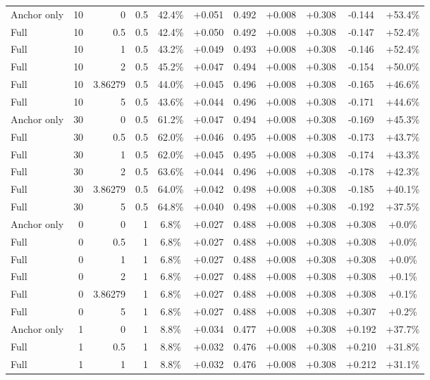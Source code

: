\begin{table}[htbp]
\begin{tabular}{lrrrccccccc}
Anchor only & 10 & 0 & 0.5 & 42.4\% & +0.051 & 0.492 & +0.008 & +0.308 & -0.144 & +53.4\% \\
Full & 10 & 0.5 & 0.5 & 42.4\% & +0.050 & 0.492 & +0.008 & +0.308 & -0.147 & +52.4\% \\
Full & 10 & 1 & 0.5 & 43.2\% & +0.049 & 0.493 & +0.008 & +0.308 & -0.146 & +52.4\% \\
Full & 10 & 2 & 0.5 & 45.2\% & +0.047 & 0.494 & +0.008 & +0.308 & -0.154 & +50.0\% \\
Full & 10 & 3.86279 & 0.5 & 44.0\% & +0.045 & 0.496 & +0.008 & +0.308 & -0.165 & +46.6\% \\
Full & 10 & 5 & 0.5 & 43.6\% & +0.044 & 0.496 & +0.008 & +0.308 & -0.171 & +44.6\% \\
Anchor only & 30 & 0 & 0.5 & 61.2\% & +0.047 & 0.494 & +0.008 & +0.308 & -0.169 & +45.3\% \\
Full & 30 & 0.5 & 0.5 & 62.0\% & +0.046 & 0.495 & +0.008 & +0.308 & -0.173 & +43.7\% \\
Full & 30 & 1 & 0.5 & 62.0\% & +0.045 & 0.495 & +0.008 & +0.308 & -0.174 & +43.3\% \\
Full & 30 & 2 & 0.5 & 63.6\% & +0.044 & 0.496 & +0.008 & +0.308 & -0.178 & +42.3\% \\
Full & 30 & 3.86279 & 0.5 & 64.0\% & +0.042 & 0.498 & +0.008 & +0.308 & -0.185 & +40.1\% \\
Full & 30 & 5 & 0.5 & 64.8\% & +0.040 & 0.498 & +0.008 & +0.308 & -0.192 & +37.5\% \\
Anchor only & 0 & 0 & 1 & 6.8\% & +0.027 & 0.488 & +0.008 & +0.308 & +0.308 & +0.0\% \\
Full & 0 & 0.5 & 1 & 6.8\% & +0.027 & 0.488 & +0.008 & +0.308 & +0.308 & +0.0\% \\
Full & 0 & 1 & 1 & 6.8\% & +0.027 & 0.488 & +0.008 & +0.308 & +0.308 & +0.0\% \\
Full & 0 & 2 & 1 & 6.8\% & +0.027 & 0.488 & +0.008 & +0.308 & +0.308 & +0.1\% \\
Full & 0 & 3.86279 & 1 & 6.8\% & +0.027 & 0.488 & +0.008 & +0.308 & +0.308 & +0.1\% \\
Full & 0 & 5 & 1 & 6.8\% & +0.027 & 0.488 & +0.008 & +0.308 & +0.307 & +0.2\% \\
Anchor only & 1 & 0 & 1 & 8.8\% & +0.034 & 0.477 & +0.008 & +0.308 & +0.192 & +37.7\% \\
Full & 1 & 0.5 & 1 & 8.8\% & +0.032 & 0.476 & +0.008 & +0.308 & +0.210 & +31.8\% \\
Full & 1 & 1 & 1 & 8.8\% & +0.032 & 0.476 & +0.008 & +0.308 & +0.212 & +31.1\% \\

\end{tabular}
\end{table}
